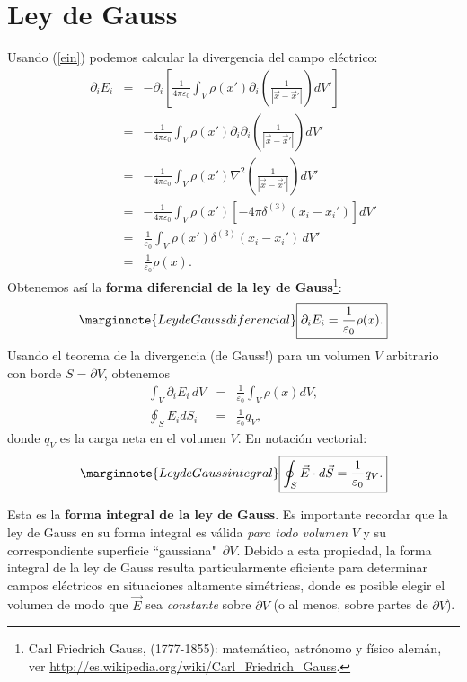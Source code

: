 \section{Ley de Gauss}
Usando (\ref{ein}) podemos calcular la divergencia del campo eléctrico:
\begin{eqnarray}
\partial_iE_i &=&-\partial_i\left[
\frac{1}{4\pi\varepsilon_0}\int_V\rho(x')\partial_i\left(\frac{1}{\left\vert
\vec x-\vec x'\right\vert }\right)  dV'\right] \\
&=&-
\frac{1}{4\pi\varepsilon_0}\int_V\rho(x')\partial_i\partial_i\left(\frac{1}{
\left\vert \vec x-\vec x'\right\vert }\right)  dV' \\
&=&-
\frac{1}{4\pi\varepsilon_0}\int_V\rho(x')\nabla^2\left(\frac{1}{\left\vert
\vec x-\vec x'\right\vert }\right)  dV' \\
&=&-
\frac{1}{4\pi\varepsilon_0}\int_V\rho(x')\left[-4\pi\delta^{(3)}(x_i-x_i')\right]
dV' \\
&=& \frac{1}{\varepsilon_0}\int_V\rho(x')\delta^{(3)}(x_i-x_i')\, dV' \\
&=& \frac{1}{\varepsilon_0}\rho(x).
\end{eqnarray}
Obtenemos así la \textbf{forma diferencial de la ley de Gauss}\footnote{Carl Friedrich Gauss, (1777-1855): matemático, astrónomo y físico alemán, ver \url{http://es.wikipedia.org/wiki/Carl_Friedrich_Gauss}.}:
\begin{equation}\marginnote{Ley de Gauss diferencial}
\boxed{\partial_iE_i =\frac{1}{\varepsilon_0}\rho(x).} \label{leygauss-dif}
\end{equation}
Usando el teorema de la divergencia (de Gauss!) para un volumen $V$ arbitrario
con borde $S=\partial V$, obtenemos
\begin{eqnarray}
\int_V\partial_iE_i\,dV  &=&\frac{1}{\varepsilon_0}\int_V\rho(x)dV ,\\
\oint_S E_idS_i &=&\frac{1}{\varepsilon_0}q_V,
\end{eqnarray}
donde $q_V$ es la carga neta en el volumen $V$. En notación vectorial:
\begin{equation}\marginnote{Ley de Gauss integral}
\boxed{\oint_S \vec{E}\cdot d\vec{S} =\frac{1}{\varepsilon_0}q_V .}
\end{equation}

Esta es la \textbf{forma integral de la ley de Gauss}. Es importante recordar que la ley de Gauss en su forma integral es válida \textit{para todo volumen} $V$ y su correspondiente superficie ``gaussiana"\, $\partial V$. Debido a esta propiedad, la forma integral de la ley de Gauss resulta particularmente eficiente para determinar campos eléctricos en situaciones altamente simétricas, donde es posible elegir el volumen de modo que $\vec{E}$ sea \textit{constante} sobre $\partial V$ (o al menos, sobre partes de $\partial V$).

